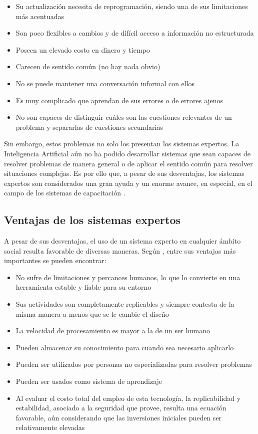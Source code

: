 \begin{itemize}
\item Su actualización necesita de reprogramación, siendo una de sus limitaciones más acentuadas
\item Son poco flexibles a cambios y de difícil acceso a información no estructurada
\item Poseen un elevado costo en dinero y tiempo
\item Carecen de sentido común (no hay nada obvio)
\item No se puede mantener una conversación informal con ellos
\item Es muy complicado que aprendan de sus errores o de errores ajenos
\item No son capaces de distinguir cuáles son las cuestiones relevantes de un
problema y separarlas de cuestiones secundarias
\end{itemize}

Sin embargo, estos problemas no solo los presentan los sistemas expertos. La Inteligencia Artificial aún no ha podido desarrollar sistemas que
sean capaces de resolver problemas de manera general o de aplicar el sentido común para resolver situaciones complejas. Es por ello que, a pesar de sus desventajas, los sistemas expertos son considerados una gran ayuda y un enorme avance, en especial, en el campo de los sistemas de capacitación \cite{Barham2022}.

\subsection{Ventajas de los sistemas expertos}
A pesar de sus desventajas, el uso de un sistema experto en cualquier ámbito social resulta favorable de diversas maneras. Según \cite{Mitchell1990}, entre sus ventajas más importantes se pueden encontrar:

\begin{itemize}
\item No sufre de limitaciones y percances humanos, lo que lo convierte en una herramienta estable y fiable para su entorno
\item Sus actividades son completamente replicables y siempre contesta de la misma manera a menos que se le cambie el diseño
\item La velocidad de procesamiento es mayor a la de un ser humano
\item Pueden almacenar su conocimiento para cuando sea necesario aplicarlo
\item Pueden ser utilizados por personas no especializadas para resolver problemas
\item Pueden ser usados como sistema de aprendizaje
\item Al evaluar el costo total del empleo de esta tecnología, la replicabilidad y estabilidad, asociado a la seguridad que provee, resulta una ecuación favorable, aún considerando que las inversiones iniciales pueden ser
relativamente elevadas
\end{itemize}

